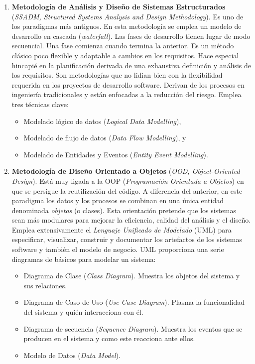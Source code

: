 \begin{enumerate}
\item \textbf{Metodología de Análisis y Diseño de Sistemas Estructurados} (\emph{SSADM, Structured Systems Analysis and Design Methodology}). Es uno de los paradigmas más antiguos. En esta metodología se emplea un modelo de desarrollo en cascada (\emph{waterfall}). Las fases de desarrollo tienen lugar de modo secuencial. Una fase comienza cuando termina la anterior. Es un método clásico poco flexible y adaptable a cambios en los requisitos. Hace especial hincapié en la planificación derivada de una exhaustiva definición y análisis de los requisitos. Son metodologías que no lidian bien con la flexibilidad requerida en los proyectos de desarrollo software. Derivan de los procesos en  ingeniería tradicionales y están enfocadas a la reducción del riesgo. Emplea tres técnicas clave:

\begin{itemize}
\item Modelado lógico de datos (\emph{Logical Data Modelling}),
\item Modelado de flujo de datos (\emph{Data Flow Modelling}), y
\item Modelado de Entidades y Eventos (\emph{Entity Event  Modelling}).
\end{itemize} 

\item \textbf{Metodología de Diseño Orientado a Objetos} (\emph{OOD,  Object-Oriented Design}). Está muy ligada a la OOP (\emph{Programación Orientada a Objetos}) en que se persigue la reutilización del código. A diferencia del anterior, en este paradigma los datos y los procesos se combinan en una única entidad denominada \emph{objetos} (o clases). Esta orientación pretende que los sistemas sean más modulares para mejorar la eficiencia, calidad del análisis y el diseño. Emplea extensivamente el \emph{Lenguaje Unificado de Modelado} (UML) para especificar, visualizar, construir y documentar los artefactos de los sistemas software y  también el modelo de negocio. UML proporciona una serie diagramas de básicos para modelar un sistema: 

\begin{itemize}
\item Diagrama de Clase (\emph{Class Diagram}). Muestra los objetos del sistema y sus relaciones. 
\item Diagrama de Caso de Uso (\emph{Use Case Diagram}). Plasma la   funcionalidad del sistema y quién interacciona con él.
\item Diagrama de secuencia (\emph{Sequence Diagram}). Muestra los eventos que se producen en el sistema y como este reacciona ante ellos. 
\item Modelo de Datos (\emph{Data Model}).
\end{itemize} 
                               

\end{enumerate}
